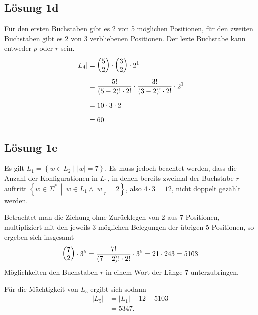\documentclass[main.tex]{subfiles}
\begin{document}
\subsection{Lösung 1d}
Für den ersten Buchstaben gibt es 2 von 5 möglichen Positionen, für den zweiten Buchstaben gibt es 2 von 3 verbliebenen Positionen.
Der lezte Buchstabe kann entweder $p$ oder $r$ sein.
\begin{align*}
    |L_4| &= \vektor{5\\ 2} \cdot \vektor{3\\ 2} \cdot 2^1 \\[1mm]
        &= \frac{5!}{(5-2)!\cdot 2!} \cdot \frac{3!}{(3-2)!\cdot 2!} \cdot 2^1 \\[2mm]
        &= 10 \cdot 3 \cdot 2 \\[2mm]
        &= 60
\end{align*}

\subsection{Lösung 1e}

Es gilt $L_1 = \left\{w \in L_2 \middle| |w|=7\right\}$. Es muss jedoch beachtet werden, dass die Anzahl der Konfigurationen in $L_1$,
in denen bereits zweimal der Buchstabe $r$ auftritt $\left\{ w\in \Sigma^*\ \middle|\ w\in L_1 \land |w|_r = 2 \right\}$,
also $4\cdot3 = 12$, nicht doppelt gezählt werden.

Betrachtet man die Ziehung ohne Zurücklegen von 2 aus 7 Positionen, multipliziert mit den jeweils 3 möglichen Belegungen der übrigen 5 Positionen, so ergeben sich
insgesamt
$$
    \vektor{7\\ 2} \cdot 3^5 = \frac{7!}{(7-2)!\cdot 2!} \cdot 3^5 = 21 \cdot 243 = 5103
$$
Möglichkeiten den Buchstaben $r$ in einem Wort der Länge 7 unterzubringen.

Für die Mächtigkeit von $L_5$ ergibt sich sodann
\begin{align*}
    |L_5| &= |L_1| - 12 + 5103 \\[1mm]
          &= 5347.
\end{align*}
\end{document}
